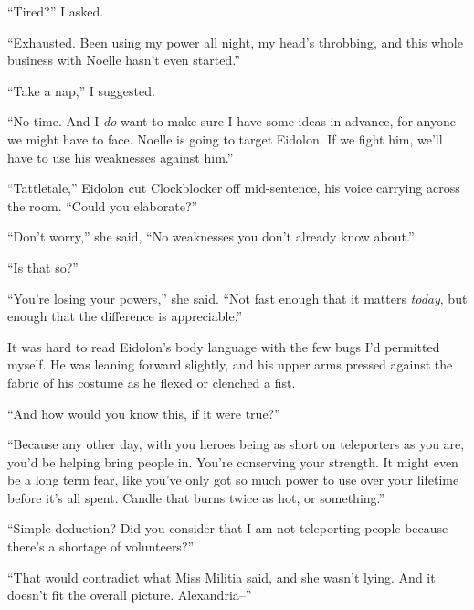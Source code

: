 ``Tired?'' I asked.



``Exhausted.  Been using my power all night, my head's throbbing, and this whole business with Noelle hasn't even started.''



``Take a nap,'' I suggested.



``No time.  And I \emph{do} want to make sure I have some ideas in advance, for anyone we might have to face.  Noelle is going to target Eidolon.  If we fight him, we'll have to use his weaknesses against him.''



``Tattletale,'' Eidolon cut Clockblocker off mid-sentence, his voice carrying across the room.  ``Could you elaborate?''



``Don't worry,'' she said, ``No weaknesses you don't already know about.''



``Is that so?''



``You're losing your powers,'' she said.  ``Not fast enough that it matters \emph{today}, but enough that the difference is appreciable.''



It was hard to read Eidolon's body language with the few bugs I'd permitted myself.  He was leaning forward slightly, and his upper arms pressed against the fabric of his costume as he flexed or clenched a fist.



``And how would you know this, if it were true?''



``Because any other day, with you heroes being as short on teleporters as you are, you'd be helping bring people in.  You're conserving your strength.  It might even be a long term fear, like you've only got so much power to use over your lifetime before it's all spent.  Candle that burns twice as hot, or something.''



``Simple deduction?  Did you consider that I am not teleporting people because there's a shortage of volunteers?''



``That would contradict what Miss Militia said, and she wasn't lying.  And it doesn't fit the overall picture.  Alexandria--''



